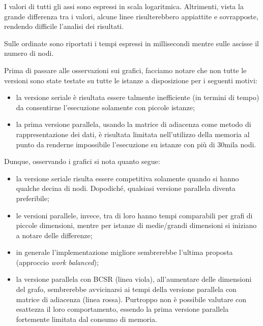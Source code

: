         I valori di tutti gli assi sono espressi in scala logaritmica. Altrimenti, vista la grande differenza tra i valori, alcune linee risulterebbero appiattite e sovrapposte, rendendo difficile l'analisi dei risultati.

        Sulle ordinate sono riportati i tempi espressi in millisecondi mentre sulle ascisse il numero di nodi.

        Prima di passare alle osservazioni sui grafici, facciamo notare che non tutte le versioni sono state testate su tutte le istanze a disposizione per i seguenti motivi:
        \begin{itemize}
            \item la versione seriale è risultata essere talmente inefficiente (in termini di tempo) da consentirne l'esecuzione solamente con piccole istanze;
            \item la prima versione parallela, usando la matrice di adiacenza come metodo di rappresentazione dei dati, è risultata limitata nell'utilizzo della memoria al punto da renderne impossibile l'esecuzione su istanze con più di 30mila nodi.
        \end{itemize}

        Dunque, osservando i grafici si nota quanto segue:
        \begin{itemize}
            \item la versione seriale risulta essere competitiva solamente quando si hanno qualche decina di nodi. Dopodiché, qualsiasi versione parallela diventa preferibile;
            \item le versioni parallele, invece, tra di loro hanno tempi comparabili per grafi di piccole dimensioni, mentre per istanze di medie/grandi dimensioni si iniziano a notare delle differenze;
            \item in generale l'implementazione migliore sembrerebbe l'ultima proposta (approccio \textit{work balanced});
            \item la versione parallela con BCSR (linea viola), all'aumentare delle dimensioni del grafo, sembrerebbe avvicinarsi ai tempi della versione parallela con matrice di adiacenza (linea rossa). Purtroppo non è possibile valutare con esattezza il loro comportamento, essendo la prima versione parallela fortemente limitata dal consumo di memoria.            
        \end{itemize}
        

